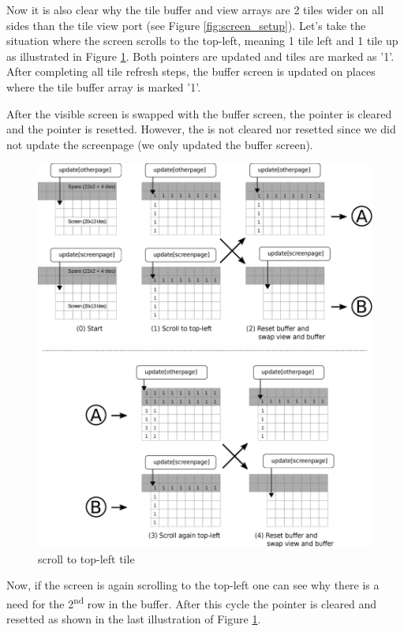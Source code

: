 \documentclass[book.tex]{subfiles}
\begin{document}
Now it is also clear why the tile buffer and view arrays are 2 tiles wider on all sides than the tile view port (see Figure \ref{fig:screen_setup}). Let's take the situation where the screen scrolls to the top-left, meaning 1 tile left and 1 tile up as illustrated in Figure \ref{fig:buffer_tile_move_1}. Both  pointers are updated and tiles are marked as '1'. After completing all tile refresh steps, the buffer screen is updated on places where the tile buffer array is marked '1'. \\
\par
After the visible screen is swapped with the buffer screen, the  pointer is cleared and the pointer is resetted. However, the  is not cleared nor resetted since we did not update the screenpage (we only updated the buffer screen).\\
\begin{figure}[H]
  \centering
  \includegraphics[width=\textwidth]{imgs/drawings/buffer_tile_move.eps}
  \caption{scroll to top-left tile}
  \label{fig:buffer_tile_move_1}
\end{figure}
Now, if the screen is again scrolling to the top-left one can see why there is a need for the 2\textsuperscript{nd} row in the buffer. After this cycle the  pointer is cleared and resetted as shown in the last illustration of Figure \ref{fig:buffer_tile_move_1}.\\
\pagebreak
\end{document}
